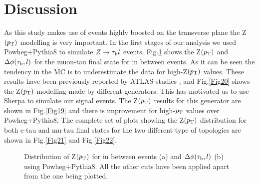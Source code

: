\section{Discussion}
As this study makes use of events highly boosted on the transverse plane the Z$(p_\text{T})$ modelling is very important. In the first stages of our analysis we used Powheg+Pythia8 to simulate $Z\to\tau_\text{h} l$ events. Fig.\ref{Fig23} shows the Z$(p_\text{T})$ and $\Delta\phi(\tau_\text{h},l)$ for the muon-tau final state for in between events. As it can be seen the tendency in the MC is to underestimate the data for high-Z$(p_\text{T})$ values. These results have been previously reported by ATLAS studies \cite{Aad:2019wmn}, and Fig.\ref{Fig20} shows the Z$(p_\text{T})$ modelling made by different generators. This has motivated us to use Sherpa to simulate our signal events. The Z$(p_\text{T})$ results for this generator are shown in Fig.\ref{Fig19} and there is improvement for high-$p_\text{T}$ values over Powheg+Pythia8. The complete set of plots showing the Z$(p_\text{T})$ distribution for both e-tau and mu-tau final states for the two different type of topologies are shown in Fig.\ref{Fig21} and Fig.\ref{Fig22}.
\begin{figure}[H]
	\centering
	\hfill
	\caption{Distribution of Z$(p_\text{T})$ for in between events (a) and $\Delta\phi(\tau_\text{h},l)$ (b) using Powheg+Pythia8. All the other cuts have been applied apart from the one being plotted.}
	\label{Fig23}
\end{figure}
